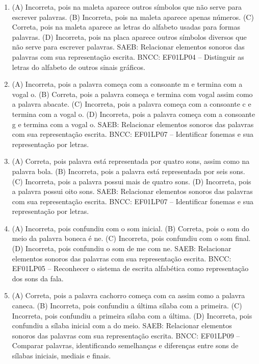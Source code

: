 \begin{enumerate}
\item
(A) Incorreta, pois na maleta aparece outros símbolos que não serve
para escrever palavras.
(B) Incorreta, pois na maleta aparece apenas números.
(C) Correta, pois na maleta aparece as letras do alfabeto usadas para
formas palavras.
(D) Incorreta, pois na placa aparece outros símbolos diversos que não
serve para escrever palavras.
SAEB: Relacionar elementos sonoros das palavras com sua representação escrita.	
BNCC: EF01LP04 -- Distinguir as letras do alfabeto de outros sinais
gráficos.

\item
(A) Incorreta, pois a palavra começa com a consoante m e termina com a vogal o.
(B) Correta, pois a palavra começa e termina com vogal assim como a
palavra abacate.
(C) Incorreta, pois a palavra começa com a consoante c e termina com a
vogal o.
(D) Incorreta, pois a palavra começa com a consoante g e termina com a
vogal o.
SAEB: Relacionar elementos sonoros das palavras com sua
representação escrita.
BNCC: EF01LP07 -- Identificar fonemas e sua representação por
letras.

\item
(A) Correta, pois palavra está representada por quatro sons, assim como
na palavra bola.
(B) Incorreta, pois a palavra está representada por seis sons.
(C) Incorreta, pois a palavra possui mais de quatro sons.
(D) Incorreta, pois a palavra possui oito sons.
SAEB: Relacionar elementos sonoros das palavras com sua
representação escrita.
BNCC: EF01LP07 -- Identificar fonemas e sua representação por
letras.

\item
(A) Incorreta, pois confundiu com o som inicial.
(B) Correta, pois o som do meio da palavra boneca é ne.
(C) Incorreta, pois confundiu com o som final.
(D) Incorreta, pois confundiu o som de me com ne.
SAEB: Relacionar elementos sonoros das palavras com sua
representação escrita.
BNCC: EF01LP05 -- Reconhecer o sistema de escrita alfabética como
representação dos sons da fala.

\item
(A) Correta, pois a palavra cachorro começa com ca assim como a palavra
caneca.
(B) Incorreta, pois confundiu a última sílaba com a primeira.
(C) Incorreta, pois confundiu a primeira sílaba com a última.
(D) Incorreta, pois confundiu a sílaba inicial com a do meio.
SAEB: Relacionar elementos sonoros das palavras com sua
representação escrita.
BNCC: EF01LP09 -- Comparar palavras, identificando semelhanças e
diferenças entre sons de sílabas iniciais, mediais e finais.


\end{enumerate}
